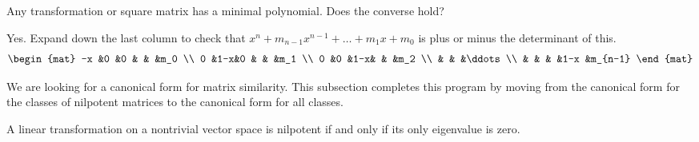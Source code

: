 \begin{exercises}
  \item
    Any transformation or square matrix has a minimal polynomial.
    Does the converse hold?
    \begin{answer}
      Yes.
      Expand down the last column to check that
      \( x^n+m_{n-1}x^{n-1}+\dots+m_1x+m_0 \) is plus or minus the
      determinant of this.
      \begin{equation*}
         \begin{mat}
            -x  &0  &0  &      &    &m_0    \\
             0  &1-x&0  &      &    &m_1    \\
             0  &0  &1-x&      &    &m_2    \\
                &   &   &\ddots             \\
                &   &   &      &1-x &m_{n-1}
         \end{mat}
      \end{equation*} 
     \end{answer}
\end{exercises}












We are looking for a canonical form for matrix similarity.
This subsection completes this program by moving
from the canonical form for the classes 
of nilpotent matrices to
the canonical form for all classes.

\begin{lemma} \label{le:NilIffOnlyEigenZero}
A linear transformation on a nontrivial vector space 
is nilpotent if and only if its only eigenvalue is zero.
\end{lemma}

